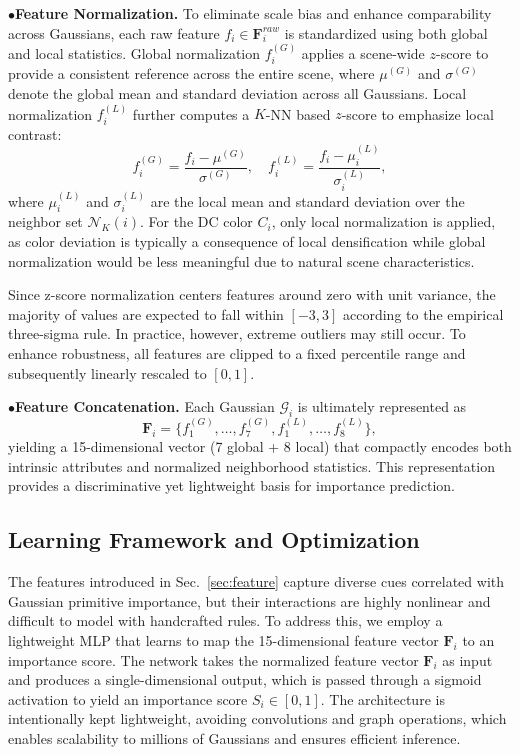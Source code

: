 $\bullet$\textbf{Feature Normalization.}  
To eliminate scale bias and enhance comparability across Gaussians, each raw feature $f_i \in \mathbf{F}^{raw}_i$ is standardized using both global and local statistics. 
Global normalization $f^{(G)}_i$ applies a scene-wide $z$-score to provide a consistent reference across the entire scene,
where $\mu^{(G)}$ and $\sigma^{(G)}$ denote the global mean and standard deviation across all Gaussians. Local normalization $f^{(L)}_i$ further computes a $K$-NN based $z$-score to emphasize local contrast:
\begin{equation}
f^{(G)}_i = \frac{f_i - \mu^{(G)}}{\sigma^{(G)}}, \quad f^{(L)}_i = \frac{f_i - \mu^{(L)}_i}{\sigma^{(L)}_i},
\end{equation}
where $\mu^{(L)}_i$ and $\sigma^{(L)}_i$ are the local mean and standard deviation over the neighbor set $\mathcal{N}_K(i)$. 
For the DC color $C_i$, only local normalization is applied, as color deviation is typically a consequence of local densification while global normalization would be less meaningful due to natural scene characteristics. 

Since z-score normalization centers features around zero with unit variance, the majority of values are expected to fall within $[-3,3]$ according to the empirical three-sigma rule. In practice, however, extreme outliers may still occur. To enhance robustness, all features are clipped to a fixed percentile range and subsequently linearly rescaled to $[0,1]$.

$\bullet$\textbf{Feature Concatenation.}  
Each Gaussian $\mathcal{G}_i$ is ultimately represented as
\begin{equation}
\mathbf{F}_i = \{f^{(G)}_1, \ldots, f^{(G)}_7, f^{(L)}_1, \ldots, f^{(L)}_8\},
\end{equation}
yielding a 15-dimensional vector (7 global + 8 local) that compactly encodes both intrinsic attributes and normalized neighborhood statistics. This representation provides a discriminative yet lightweight basis for importance prediction.


\subsection{Learning Framework and Optimization}
\label{sec:loss}
The features introduced in Sec.~\ref{sec:feature} capture diverse cues correlated with Gaussian primitive importance, but their interactions are highly nonlinear and difficult to model with handcrafted rules. To address this, we employ a lightweight MLP that learns to map the 15-dimensional feature vector $\mathbf{F}_i$ to an importance score. The network takes the normalized feature vector $\mathbf{F}_i$ as input and produces a single-dimensional output, which is passed through a sigmoid activation to yield an importance score $S_i \in [0,1]$. The architecture is intentionally kept lightweight, avoiding convolutions and graph operations, which enables scalability to millions of Gaussians and ensures efficient inference. 

